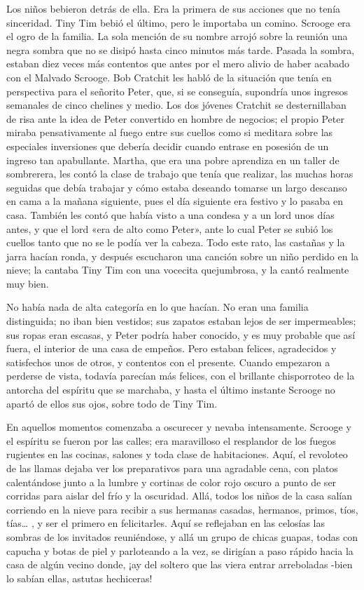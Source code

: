 \documentclass{novela}
\begin{document}
 Los niños bebieron detrás de ella. Era la primera de sus acciones que no tenía sinceridad. Tiny Tim bebió el último, pero le importaba un comino. Scrooge era el ogro de la familia. La sola mención de su nombre arrojó sobre la reunión una negra sombra que no se disipó hasta cinco minutos más tarde. Pasada la sombra, estaban diez veces más contentos que antes por el mero alivio de haber acabado con el Malvado Scrooge. Bob Cratchit les habló de la situación que tenía en perspectiva para el señorito Peter, que, si se conseguía, supondría unos ingresos semanales de cinco chelines y medio. Los dos jóvenes Cratchit se desternillaban de risa ante la idea de Peter convertido en hombre de negocios; el propio Peter miraba pensativamente al fuego entre sus cuellos como si meditara sobre las especiales inversiones que debería decidir cuando entrase en posesión de un ingreso tan apabullante. Martha, que era una pobre aprendiza en un taller de sombrerera, les contó la clase de trabajo que tenía que realizar, las muchas horas seguidas que debía trabajar y cómo estaba deseando tomarse un largo descanso en cama a la mañana siguiente, pues el día siguiente era festivo y lo pasaba en casa. También les contó que había visto a una condesa y a un lord unos días antes, y que el lord «era de alto como Peter», ante lo cual Peter se subió los cuellos tanto que no se le podía ver la cabeza. Todo este rato, las castañas y la jarra hacían ronda, y después escucharon una canción sobre un niño perdido en la nieve; la cantaba Tiny Tim con una vocecita quejumbrosa, y la cantó realmente muy bien.

 No había nada de alta categoría en lo que hacían. No eran una familia distinguida; no iban bien vestidos; sus zapatos estaban lejos de ser impermeables; sus ropas eran escasas, y Peter podría haber conocido, y es muy probable que así fuera, el interior de una casa de empeños. Pero estaban felices, agradecidos y satisfechos unos de otros, y contentos con el presente. Cuando empezaron a perderse de vista, todavía parecían más felices, con el brillante chisporroteo de la antorcha del espíritu que se marchaba, y hasta el último instante Scrooge no apartó de ellos sus ojos, sobre todo de Tiny Tim.

 En aquellos momentos comenzaba a oscurecer y nevaba intensamente. Scrooge y el espíritu se fueron por las calles; era maravilloso el resplandor de los fuegos rugientes en las cocinas, salones y toda clase de habitaciones. Aquí, el revoloteo de las llamas dejaba ver los preparativos para una agradable cena, con platos calentándose junto a la lumbre y cortinas de color rojo oscuro a punto de ser corridas para aislar del frío y la oscuridad. Allá, todos los niños de la casa salían corriendo en la nieve para recibir a sus hermanas casadas, hermanos, primos, tíos, tías{\ldots} , y ser el primero en felicitarles. Aquí se reflejaban en las celosías las sombras de los invitados reuniéndose, y allá un grupo de chicas guapas, todas con capucha y botas de piel y parloteando a la vez, se dirigían a paso rápido hacia la casa de algún vecino donde, ¡ay del soltero que las viera entrar arreboladas -bien lo sabían ellas, astutas hechiceras!
\end{document}
